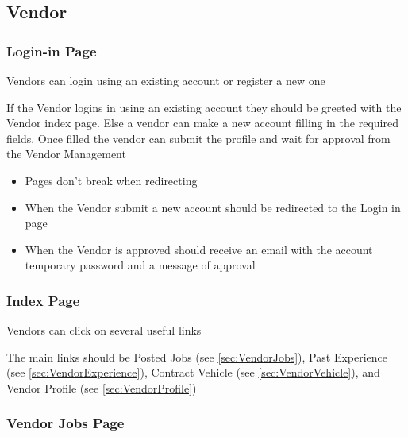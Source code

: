 \documentclass[10pt]{article}
\newcounter{subsubsubsection}[subsubsection]
\begin{document}
\subsection{Vendor}

\subsubsection{Login-in Page}\label{sec:VendorLogin}


Vendors can login using an existing account or register a new one 


If the Vendor logins in using an existing account they should be greeted with the Vendor index page. Else a vendor can make a new account filling in the required fields. Once filled the vendor can submit the profile and wait for approval from the Vendor Management


\begin{itemize}
	\item Pages don't break when redirecting
	\item When the Vendor submit a new account should be redirected to the Login in page
	\item When the Vendor is approved should receive an email with the account temporary password and a message of approval 
\end{itemize}

\subsubsection{Index Page}\label{sec:VendorIndex}


Vendors can click on several useful links 


The main links should be Posted Jobs (see \vref{sec:VendorJobs}), Past Experience (see \vref{sec:VendorExperience}), Contract Vehicle (see \vref{sec:VendorVehicle}), and Vendor Profile (see \vref{sec:VendorProfile})

\subsubsection{Vendor Jobs Page}\label{sec:VendorJobs}
\end{document}
